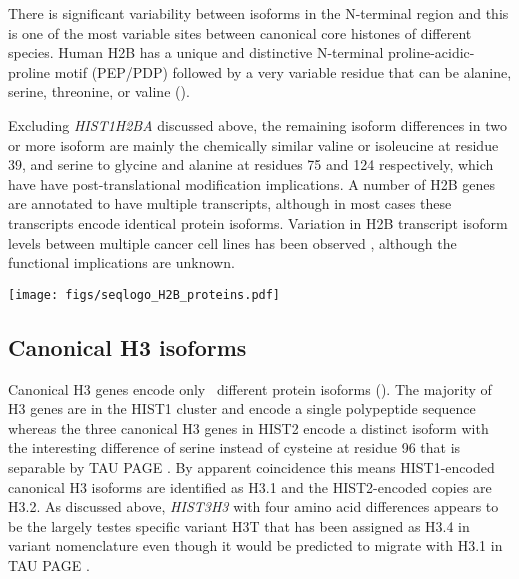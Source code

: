     There is significant variability between isoforms in the N-terminal region
    and this is one of the most variable sites between canonical
    core histones of different species.
    Human H2B has a unique and distinctive N-terminal proline-acidic-proline motif (PEP/PDP)
    followed by a very variable residue that can be alanine, serine,
    threonine, or valine ().

    Excluding \textit{HIST1H2BA} discussed above,
    the remaining isoform differences in two or more isoform are mainly the chemically
    similar valine or isoleucine at residue 39,
    and serine to glycine and alanine at residues 75 and 124 respectively,
    which have have post-translational modification implications.
    A number of H2B genes are annotated to have multiple transcripts,
    although in most cases these transcripts encode identical protein isoforms.
    Variation in H2B transcript isoform levels between multiple cancer cell
    lines has been observed \citep{Molden2015},
    although the functional implications are unknown.

    \begin{table}
      \caption{%
        Canonical H2B encoded protein isoforms.
        Upper panel shows isoform variations relative to most common isoform
        using HGVS recommended nomenclature \citep{mutnomenclature2016}.
        For clarity, isoforms encoded by multiple transcripts of a single gene
        are distingushed by a numerical suffix (see ).
        Lower panel shows sequence logo of all isoforms aligned
        with invariant residues in grey.
      }
      \label{tab:H2B-consensus}
      
      \texttt{[image: figs/seqlogo\_H2B\_proteins.pdf]}
    \end{table}

  \subsection{Canonical H3 isoforms}
    Canonical H3 genes encode only \HThreeUniqueProteins{}~different
    protein isoforms ().
    The majority of H3 genes are in the HIST1 cluster and encode a
    single polypeptide sequence \citep{Ederveen2011}
    whereas the three canonical H3 genes in HIST2 encode a distinct isoform
    with the interesting difference of serine instead of cysteine at residue 96
    that is separable by TAU PAGE \citep{FranklinZweidler1977}.
    By apparent coincidence this means HIST1-encoded canonical H3 isoforms are
    identified as H3.1 and the HIST2-encoded copies are H3.2.
    As discussed above, \textit{HIST3H3} with four amino acid differences
    appears to be the largely testes specific variant H3T
    that has been assigned as H3.4 in variant nomenclature \citep{Talbert2012}
    even though it would be predicted to migrate with H3.1 in TAU PAGE \citep{FranklinZweidler1977}.

